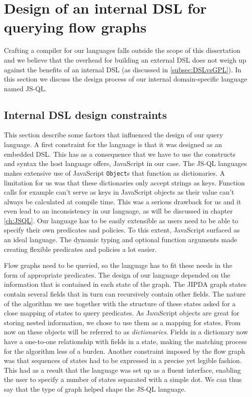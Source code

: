 \section{Design of an internal DSL for querying flow graphs}
\label{sec:DesignInternalDSL}

Crafting a compiler for our languages falls outside the scope of this dissertation and we believe that the overhead for building an external DSL does not weigh up against the benefits of an internal DSL (as discussed in \ref{subsec:DSLvsGPL}).
In this section we discuss the design process of our internal domain-specific language named JS-QL.

\subsection{Internal DSL design constraints}

This section describe some factors that influenced the design of our query language. A first constraint for the language is that it was designed as an embedded DSL. This has as a consequence that we have to use the constructs and syntax the host language offers, JavaScript in our case. The JS-QL languages makes extensive use of JavaScript \texttt{Object}s that function as dictionaries. A limitation for us was that these dictionaries only accept strings as keys. Function calls for example can't serve as keys in JavaScript objects as their value can't always be calculated at compile time. This was a serious drawback for us and it even lead to an inconsistency in our language, as will be discussed in chapter \ref{ch:JSQL}. 
Our language has to be easily extensible as users need to be able to specify their own predicates and policies. To this extent, JavaScript surfaced as an ideal language. The dynamic typing and optional function arguments made creating flexible predicates and policies a lot easier.

Flow graphs need to be queried, so the language has to fit these needs in the form of appropriate predicates. The design of our language depended on the information that is contained in each state of the graph. The JIPDA graph states contain several fields that in turn can recursively contain other fields. The nature of the algorithm we use together with the structure of these states asked for a close mapping of states to query predicates. As JavaScript objects are great for storing nested information, we chose to use them as a mapping for states. From now on these objects will be referred to as \textit{dictionaries}. Fields in a dictionary now have a one-to-one relationship with fields in a state, making the matching process for the algorithm less of a burden. Another constraint imposed by the flow graph was that sequences of states had to be expressed in a precise yet legible fashion. This had as a result that the language was set up as a fluent interface, enabling the user to specify a number of states separated with a simple dot. We can thus say that the type of graph helped shape the JS-QL language.

